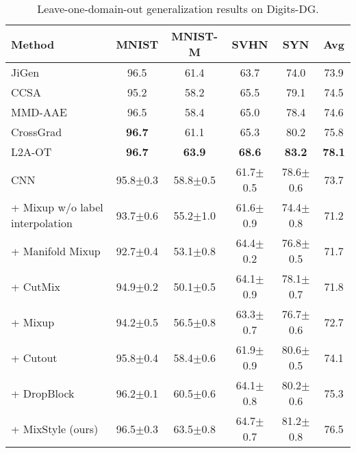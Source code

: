 \documentclass{article} \usepackage{iclr2021_conference,times}
\newcommand{\tableCellHeight}{1}
\newcommand{\tabstyle}[1]{
  \setlength{\tabcolsep}{#1}
  \renewcommand{\arraystretch}{\tableCellHeight}
  \centering
}
\begin{document}
\begin{table}[t]
\tabstyle{6pt}
\caption{Leave-one-domain-out generalization results on Digits-DG.}
\label{tab:result_digits_dg}
\begin{tabular}{l | c c c c | c}
\hline
Method & MNIST & MNIST-M & SVHN & SYN & Avg \\
\hline \hline
JiGen & 96.5 & 61.4 & 63.7 & 74.0 & 73.9 \\
CCSA & 95.2 & 58.2 & 65.5 & 79.1 & 74.5 \\
MMD-AAE & 96.5 & 58.4 & 65.0 & 78.4 & 74.6 \\
CrossGrad & \textbf{96.7} & 61.1 & 65.3 & 80.2 & 75.8 \\
L2A-OT & \textbf{96.7} & \textbf{63.9} & \textbf{68.6} & \textbf{83.2} & \textbf{78.1} \\
\hline
CNN & 95.8$\pm$0.3 & 58.8$\pm$0.5 & 61.7$\pm$0.5 & 78.6$\pm$0.6 & 73.7 \\
+ Mixup w/o label interpolation & 93.7$\pm$0.6 & 55.2$\pm$1.0 & 61.6$\pm$0.9 & 74.4$\pm$0.8 & 71.2 \\
+ Manifold Mixup & 92.7$\pm$0.4 & 53.1$\pm$0.8 & 64.4$\pm$0.2 & 76.8$\pm$0.5 & 71.7 \\
+ CutMix & 94.9$\pm$0.2 & 50.1$\pm$0.5 & 64.1$\pm$0.9 & 78.1$\pm$0.7 & 71.8 \\
+ Mixup & 94.2$\pm$0.5 & 56.5$\pm$0.8 & 63.3$\pm$0.7 & 76.7$\pm$0.6 & 72.7 \\
+ Cutout & 95.8$\pm$0.4 & 58.4$\pm$0.6 & 61.9$\pm$0.9 & 80.6$\pm$0.5 & 74.1 \\
+ DropBlock & 96.2$\pm$0.1 & 60.5$\pm$0.6 & 64.1$\pm$0.8 & 80.2$\pm$0.6 & 75.3 \\
+ MixStyle (ours) & 96.5$\pm$0.3 & 63.5$\pm$0.8 & 64.7$\pm$0.7 & 81.2$\pm$0.8 & 76.5 \\
\hline
\end{tabular}
\end{table}
\end{document}
